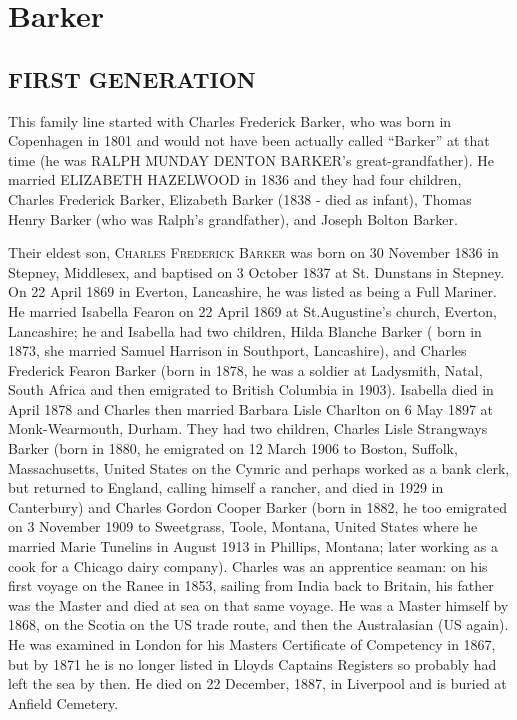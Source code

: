 \section{Barker}

\subsection{FIRST GENERATION}

This family line started with Charles Frederick Barker, who was born in Copenhagen in 1801 and would not have been actually called ``Barker'' at that time (he was \uppercase{Ralph Munday Denton Barker}'s great-grandfather). He married  \uppercase{Elizabeth Hazelwood} in 1836 and they had four children,  Charles Frederick Barker, Elizabeth Barker (1838 - died as infant), Thomas Henry Barker (who was Ralph's grandfather), and Joseph Bolton Barker.

Their eldest son,  \textsc{Charles Frederick Barker} was born on 30 November 1836 in Stepney, Middlesex, and baptised on 3 October 1837 at St. Dunstans in Stepney. On 22 April 1869 in Everton, Lancashire, he was listed as being a Full Mariner. He married Isabella Fearon on 22 April 1869 at St.Augustine's church,	Everton, Lancashire; he and Isabella had two children, Hilda Blanche Barker ( born in 1873, she married Samuel Harrison in Southport, Lancashire), and Charles Frederick Fearon Barker (born in 1878, he was a soldier at Ladysmith, Natal, South Africa and then emigrated to British Columbia in 1903). Isabella died in April 1878 and Charles then married Barbara Lisle Charlton on 6 May 1897 at Monk-Wearmouth, Durham. They had two children, Charles Lisle Strangways Barker (born in 1880, he emigrated on 12 March 1906 to	Boston, Suffolk, Massachusetts, United States on the Cymric and perhaps worked as a bank clerk, but returned to England, calling himself a rancher, and died in 1929 in Canterbury) and Charles Gordon Cooper Barker (born in 1882, he too emigrated on 3 November 1909 to	Sweetgrass, Toole, Montana, United States where he married Marie Tunelins in August 1913 in Phillips, Montana; later working as a cook for a Chicago dairy company).
Charles was an apprentice seaman: on his first voyage on the Ranee in 1853, sailing from India back to Britain, his father was the Master and died at sea on that same voyage. He was a Master himself by 1868, on the Scotia on the US trade route, and then the Australasian (US again). He was examined in London for his Masters Certificate of Competency in 1867, but by 1871 he is no longer listed in Lloyds Captains Registers so probably had left the sea by then. He died on 22 December, 1887,  in Liverpool and is buried at Anfield Cemetery.

